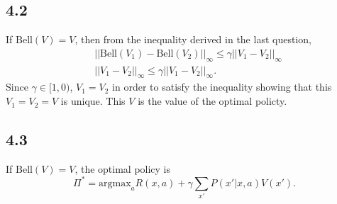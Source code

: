 \documentclass[12pt]{amsart}
\begin{document}
\subsection*{4.2}
If $\text{Bell}(V) = V$, then from the inequality derived in the last question,
\begin{equation}
\begin{split}
& ||\text{Bell}(V_1) - \text{Bell}(V_2)||_{\infty} \leq \gamma || V_1 - V_2 ||_{\infty}  \\
& || V_1 - V_2 ||_{\infty} \leq \gamma || V_1 - V_2 ||_{\infty}.
\end{split}
\end{equation}
Since $\gamma \in [1,0)$, $V_1 = V_2$ in order to satisfy the inequality showing that this $V_1 = V_2 = V$ is unique.  This $V$ is the value of the optimal policty.

\subsection*{4.3}
If $\text{Bell}(V) = V$, the optimal policy is
\begin{equation}
\Pi^* = \text{argmax}_a R(x,a) + \gamma \sum_{x'} P(x'|x,a) V(x').
\end{equation}
\end{document}
